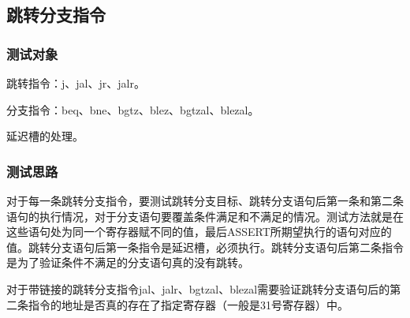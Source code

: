 \documentclass[11pt,utf8]{article}
\begin{document}
{{\subsection{跳转分支指令} {
\subsubsection{测试对象} {
跳转指令：j、jal、jr、jalr。

分支指令：beq、bne、bgtz、blez、bgtzal、blezal。

延迟槽的处理。
}
\subsubsection{测试思路} {
对于每一条跳转分支指令，要测试跳转分支目标、跳转分支语句后第一条和第二条语句的执行情况，对于分支语句要覆盖条件满足和不满足的情况。测试方法就是在这些语句处为同一个寄存器赋不同的值，最后ASSERT所期望执行的语句对应的值。跳转分支语句后第一条指令是延迟槽，必须执行。跳转分支语句后第二条指令是为了验证条件不满足的分支语句真的没有跳转。

对于带链接的跳转分支指令jal、jalr、bgtzal、blezal需要验证跳转分支语句后的第二条指令的地址是否真的存在了指定寄存器（一般是31号寄存器）中。
}
}}}
\end{document}

